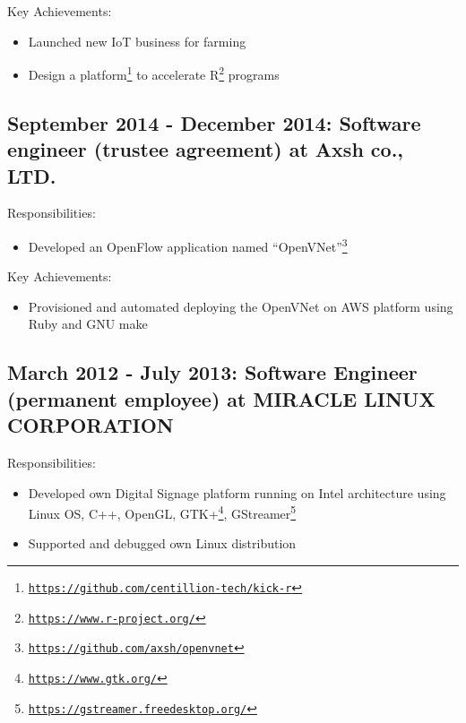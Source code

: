 \documentclass[letterpaper]{article}
\begin{document}
\noindent Key Achievements:

\begin{itemize}
  \item Launched new IoT business for farming
  \item Design a platform\footnote{\href{https://github.com/centillion-tech/kick-r}{\tt https://github.com/centillion-tech/kick-r}} to accelerate R\footnote{\href{https://www.r-project.org/}{\tt https://www.r-project.org/}} programs
\end{itemize}

\subsection*{September 2014 - December 2014: Software engineer (trustee agreement) at Axsh co., LTD.}

\noindent Responsibilities:

\begin{itemize}
  \item Developed an OpenFlow application named ``OpenVNet''\footnote{\href{https://github.com/axsh/openvnet}{\tt https://github.com/axsh/openvnet}}
\end{itemize}

\noindent Key Achievements:

\begin{itemize}
  \item Provisioned and automated deploying the OpenVNet on AWS platform using Ruby and GNU make
\end{itemize}

\subsection*{March 2012 - July 2013: Software Engineer (permanent employee) at MIRACLE LINUX CORPORATION}

\noindent Responsibilities:

\begin{itemize}
  \item Developed own Digital Signage platform running on Intel architecture using Linux OS, C++, OpenGL, GTK+\footnote{\href{https://www.gtk.org/}{\tt https://www.gtk.org/}}, GStreamer\footnote{\href{https://gstreamer.freedesktop.org/}{\tt https://gstreamer.freedesktop.org/}}
  \item Supported and debugged own Linux distribution
\end{itemize}
\end{document}
